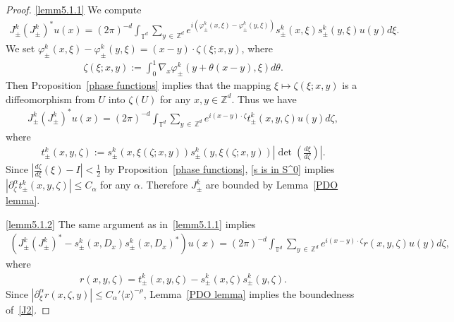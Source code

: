\documentclass[10pt]{amsart}
\theoremstyle{definition}\newtheorem{defi}[theo]{Definition}\newtheorem{rema}[theo]{Remark}\newtheorem{exam}[theo]{Example}\newtheorem{exem}[theo]{Example}\newtheorem{nota}[theo]{Notation}
\renewcommand{\a}{\alpha}
\newcommand{\f}{\varphi}
\newcommand{\z}{\zeta}
\newcommand{\x}{\xi}
\newcommand{\Z}{\mathbb{Z}}
\newcommand{\T}{\mathbb{T}}
\newcommand{\la}{\langle}
\newcommand{\ra}{\rangle}
\begin{document}
\begin{proof}
\eqref{lemm5.1.1} We compute
\begin{align*}
J_\pm^k \left(J_\pm^k\right)^* u(x) = (2\pi)^{-d} \int_{\T^d} \sum_{y\,\in\,\Z^d} e^{i\left(\f_{\pm}^k(x,\x)-\f_{\pm}^k(y,\x)\right)} s_\pm^k(x,\x) s_\pm^k(y,\x) u(y) d\x.
\end{align*}
We set $\f_{\pm}^k(x,\x)-\f_{\pm}^k(y,\x) = (x-y) \cdot \z(\x;x,y)$, where
\begin{align*}
\z(\x;x,y) := \int_0^1 \nabla_x \f_{\pm}^k(y+\theta(x-y),\x) d\theta.
\end{align*}
Then Proposition~\ref{phase functions} implies that the mapping $\x \mapsto \z(\x;x,y)$ is a diffeomorphism from $U$ into $\z(U)$ for any $x,y \in \Z^d$. Thus we have
\begin{align*}
J_\pm^k \left(J_\pm^k\right)^* u(x) = (2\pi)^{-d} \int_{\T^d} \sum_{y\,\in\,\Z^d} e^{i(x-y)\cdot\z} t_\pm^k(x,y,\z) u(y) d\z,
\end{align*}
where
\begin{align*}
t_\pm^k(x,y,\z):=s_\pm^k(x,\x(\z;x,y)) s_\pm^k(y,\x(\z;x,y)) \left|\det\left(\frac{d\x}{d\z} \right)\right|.
\end{align*}
Since $|\frac{d\z}{d\x}(\x) - I| < \frac{1}{2}$ by Proposition~\ref{phase functions}, \eqref{s is in S^0} implies $|\partial_{\z}^\a t_\pm^k(x,y,\z)|\leq C_\a$ for any $\a$. Therefore $J_\pm^k$ are bounded by Lemma~\ref{PDO lemma}.


\eqref{lemm5.1.2} The same argument as in~\eqref{lemm5.1.1} implies
\begin{align*}
\left(J_\pm^k \left(J_\pm^k\right)^* - s_\pm^k(x,D_x) s_\pm^k(x,D_x)^* \right) u(x) 
= (2\pi)^{-d} \int_{\T^d} \sum_{y\,\in\,\Z^d} e^{i(x-y)\cdot\z} r(x,y,\z) u(y) d\z,
\end{align*}
where
\begin{align*}
r(x,y,\z)=t_\pm^k(x,y,\z) - s_\pm^k(x,\z) s_\pm^k(y,\z).
\end{align*}
Since $|\partial_\x^\a r(x,\z,y)| \leq C_\a' \la x \ra^{-\rho}$, Lemma~\ref{PDO lemma} implies the boundedness of~\eqref{J2}.


\end{proof}
\end{document}
